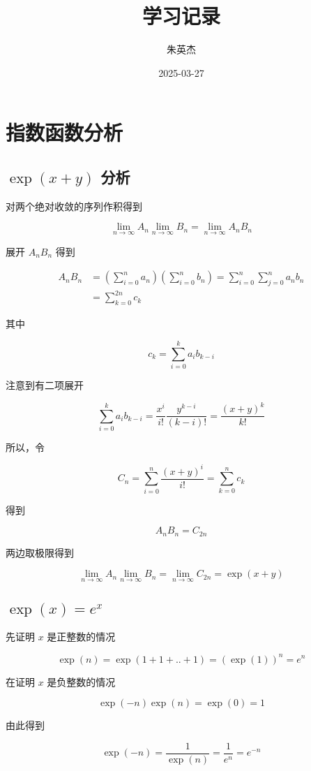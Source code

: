 \documentclass[12pt,a4paper]{ctexart}
\title{学习记录}
\author{朱英杰}
\date{2025-03-27}
\begin{document}
\maketitle
\tableofcontents

\section{指数函数分析}

\subsection{$\exp(x+y)$ 分析}

对两个绝对收敛的序列作积得到

\[
\lim_{n \to \infty}A_n\lim_{n \to \infty}B_n = \lim_{n \to \infty} A_nB_n
\]

展开 $A_nB_n$ 得到

\begin{align*}
A_nB_n &=(\sum_{i=0}^{n}a_n)(\sum_{i=0}^{n}b_n) = \sum_{i=0}^{n}\sum_{j=0}^{n}a_nb_n \\
&= \sum_{k=0}^{2n}c_k
\end{align*}

其中 

\[
c_k = \sum_{i=0}^{k}a_ib_{k-i}
\]

注意到有二项展开

\[
\sum_{i=0}^{k}a_ib_{k-i} = \frac{x^i}{i!}\frac{y^{k-i}}{(k-i)!} = \frac{(x+y)^k}{k!}
\]

所以，令

\[
C_n = \sum_{i=0}^{n}\frac{(x+y)^i}{i!} = \sum_{k=0}^{n}c_{k}
\]

得到

\[
A_nB_n = C_{2n}
\]

两边取极限得到

\[
\lim_{n \to \infty}A_n \lim_{n \to \infty}B_n = \lim_{n \to \infty}C_{2n} = \exp(x+y)
\]

\subsection{$\exp(x) = e^x$}

先证明 $x$ 是正整数的情况

\[
\exp(n) = \exp(1+1+..+1) = (\exp(1))^n = e^n
\]

在证明 $x$ 是负整数的情况

\[
\exp(-n)\exp(n) = \exp(0) = 1
\]

由此得到

\[
\exp(-n) = \frac{1}{\exp(n)} = \frac{1}{e^n} = e^{-n}
\]
\end{document}
